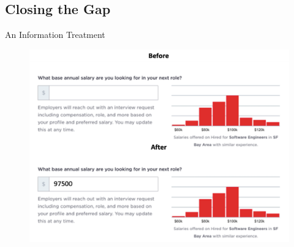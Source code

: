 \subsection*{Closing the Gap}
\begin{frame}{An Information Treatment}
    \begin{figure}
        \centering
        \includegraphics[height = 0.75 \textheight]{images/treat.png}
    \end{figure}
\end{frame}


